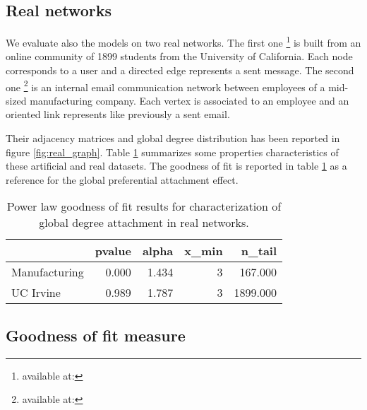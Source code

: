 \documentclass[a4paper, 12pt]{article}
\begin{document}
\subsection{Real networks}

We evaluate also the models on two  real networks.
The first one \footnote{available at:} is built from an online community of 1899 students from the University of California. Each node corresponds to a user and a    directed edge represents a sent message.
The second one \footnote{available at:} is an internal email communication network between employees of a mid-sized manufacturing company. Each vertex is associated  to an employee and an oriented link represents like previously a sent email.

Their adjacency matrices and global degree distribution has been reported in figure \ref{fig:real_graph}.  Table \ref{table:real_graph} summarizes some properties characteristics of these artificial and real datasets. The goodness of fit is reported in table \ref{table:real_graph}  as a reference for the global preferential attachment effect. 



\begin{table}
\label{table:real_graph}
\caption{Power law goodness of fit results for characterization of global degree attachment in real networks.}
\centering
\begin{tabular}{lrrrr}
   &   pvalue &   alpha &   x\_min &   n\_tail \\
\hline
 Manufacturing &    0.000 &   1.434 &       3 &  167.000 \\
 UC Irvine     &    0.989 &   1.787 &       3 & 1899.000 \\
\hline
\end{tabular}
\end{table}


\subsection{Goodness of fit measure}
\end{document}
